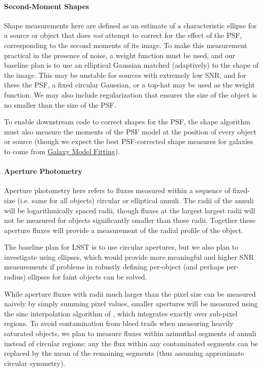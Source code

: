 \paragraph{Second-Moment Shapes}
\label{sec:acShapeAlgorithms}

Shape measurements here are defined as an estimate of a characteristic ellipse for a source or object that does \emph{not} attempt to correct for the effect of the PSF, corresponding to the second moments of its image.  To make this measurement practical in the presence of noise, a weight function must be used, and our baseline plan is to use an elliptical Gaussian matched (adaptively) to the shape of the image.  This may be unstable for sources with extremely low SNR, and for these the PSF, a fixed circular Gaussian, or a top-hat may be used as the weight function.  We may also include regularization that ensures the size of the object is no smaller than the size of the PSF.

To enable downstream code to correct shapes for the PSF, the shape algorithm must also measure the moments of the PSF model at the position of every object or source (though we expect the best PSF-corrected shape measures for galaxies to come from \hyperref[sec:acGalaxyModels]{Galaxy Model Fitting}).

\paragraph{Aperture Photometry}
\label{sec:acAperturePhotometry}

Aperture photometry here refers to fluxes measured within a sequence of fixed-size (i.e. same for all objects) circular or elliptical annuli.  The radii of the annuli will be logarithmically spaced radii, though fluxes at the largest largest radii will not be measured for objects significantly smaller than those radii.  Together these aperture fluxes will provide a measurement of the radial profile of the object.

The baseline plan for LSST is to use circular apertures, but we also plan to investigate using ellipses, which would provide more meaningful and higher SNR measurements if problems in robustly defining per-object (and perhaps per-radius) ellipses for faint objects can be solved.

While aperture fluxes with radii much larger than the pixel size can be measured naively by simply summing pixel values, smaller apertures will be measured using the $\mathrm{sinc}$ interpolation algorithm of \cite{2013MNRAS.431.1275B}, which integrates exactly over sub-pixel regions.  To avoid contamination from bleed trails when measuring heavily saturated objects, we plan to measure fluxes within azimuthal segments of annuli instead of circular regions; any the flux within any contaminated segments can be replaced by the mean of the remaining segments (thus assuming approximate circular symmetry).

